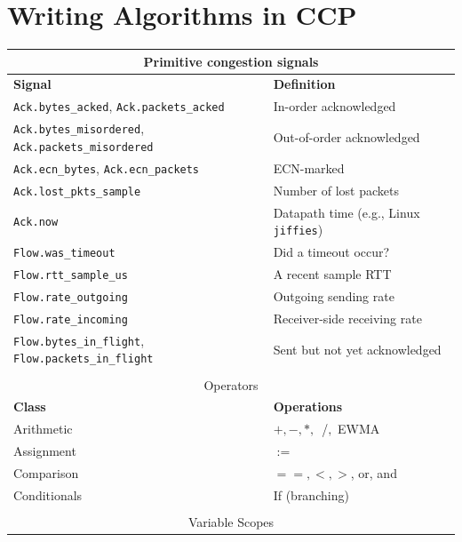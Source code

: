 \section{Writing Algorithms in CCP}
\label{sec:ccp}
\begin{table}
    \centering
    \footnotesize
    \begin{tabular}{p{}p{}}
        \hline
        \hline
        \multicolumn{2}{c}{Primitive congestion signals} \\
        \hline
        \hline
        \textbf{Signal} & \textbf{Definition} \\
        \texttt{Ack.bytes\_acked}, \texttt{Ack.packets\_acked} & In-order acknowledged \\
        \texttt{Ack.bytes\_misordered}, \texttt{Ack.packets\_misordered} & Out-of-order acknowledged \\
        \texttt{Ack.ecn\_bytes}, \texttt{Ack.ecn\_packets} & ECN-marked \\
        \texttt{Ack.lost\_pkts\_sample} & Number of lost packets \\
        \texttt{Ack.now} & Datapath time (e.g., Linux \texttt{jiffies})\\
        \texttt{Flow.was\_timeout} & Did a timeout occur? \\
        \texttt{Flow.rtt\_sample\_us} & A recent sample RTT \\
        \texttt{Flow.rate\_outgoing} & Outgoing sending rate \\
        \texttt{Flow.rate\_incoming} & Receiver-side receiving rate  \\
        \texttt{Flow.bytes\_in\_flight}, \texttt{Flow.packets\_in\_flight} & Sent but not yet acknowledged \\
        & \\
        \hline
        \hline
        \multicolumn{2}{c}{Operators} \\
        \hline
        \hline
        \textbf{Class} & \textbf{Operations} \\
        Arithmetic & $+, -, *,$~/$,$ EWMA \\
        Assignment & $:=$ \\
        Comparison & $==, <, >$, or, and \\
        Conditionals & If (branching) \\
        & \\
        \hline
        \hline
        \multicolumn{2}{c}{Variable Scopes} \\
        \hline

\end{tabular}
\end{table}
